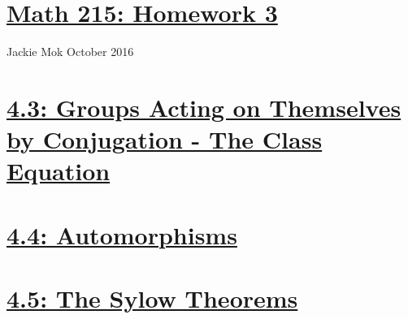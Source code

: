 \documentclass{article}
\begin{document}
\section*{\underline{Math 215: Homework 3}}
Jackie Mok
 October 2016

\section*{\underline{4.3: Groups Acting on Themselves by Conjugation - The Class Equation}}


\section*{\underline{4.4: Automorphisms}}



\section*{\underline{4.5: The Sylow Theorems}}





\end{document}
